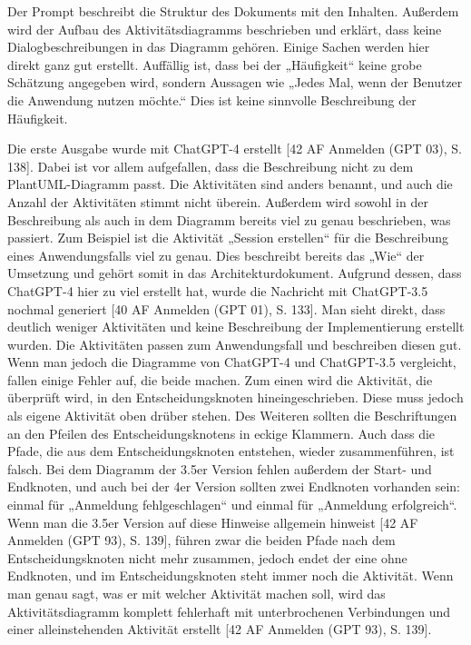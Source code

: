 Der Prompt beschreibt die Struktur des Dokuments mit den Inhalten. Außerdem wird der Aufbau des Aktivitätsdiagramms beschrieben und erklärt, 
dass keine Dialogbeschreibungen in das Diagramm gehören. Einige Sachen werden hier direkt ganz gut erstellt. Auffällig ist, dass bei der 
„Häufigkeit“ keine grobe Schätzung angegeben wird, sondern Aussagen wie „Jedes Mal, wenn der Benutzer die Anwendung nutzen möchte.“ Dies ist 
keine sinnvolle Beschreibung der Häufigkeit.

Die erste Ausgabe wurde mit ChatGPT-4 erstellt [42 AF Anmelden (GPT 03), S. 138]. Dabei ist vor allem aufgefallen, dass die Beschreibung nicht 
zu dem PlantUML-Diagramm passt. Die Aktivitäten sind anders benannt, und auch die Anzahl der Aktivitäten stimmt nicht überein. Außerdem wird 
sowohl in der Beschreibung als auch in dem Diagramm bereits viel zu genau beschrieben, was passiert. Zum Beispiel ist die Aktivität 
„Session erstellen“ für die Beschreibung eines Anwendungsfalls viel zu genau. Dies beschreibt bereits das „Wie“ der Umsetzung und gehört 
somit in das Architekturdokument. Aufgrund dessen, dass ChatGPT-4 hier zu viel erstellt hat, wurde die Nachricht mit ChatGPT-3.5 nochmal 
generiert [40 AF Anmelden (GPT 01), S. 133]. Man sieht direkt, dass deutlich weniger Aktivitäten und keine Beschreibung der Implementierung 
erstellt wurden. Die Aktivitäten passen zum Anwendungsfall und beschreiben diesen gut. Wenn man jedoch die Diagramme von ChatGPT-4 und ChatGPT-3.5 
vergleicht, fallen einige Fehler auf, die beide machen. Zum einen wird die Aktivität, die überprüft wird, in den Entscheidungsknoten 
hineingeschrieben. Diese muss jedoch als eigene Aktivität oben drüber stehen. Des Weiteren sollten die Beschriftungen an den Pfeilen des 
Entscheidungsknotens in eckige Klammern. Auch dass die Pfade, die aus dem Entscheidungsknoten entstehen, wieder zusammenführen, ist falsch. 
Bei dem Diagramm der 3.5er Version fehlen außerdem der Start- und Endknoten, und auch bei der 4er Version sollten zwei Endknoten vorhanden sein: 
einmal für „Anmeldung fehlgeschlagen“ und einmal für „Anmeldung erfolgreich“. Wenn man die 3.5er Version auf diese Hinweise allgemein hinweist 
[42 AF Anmelden (GPT 93), S. 139], führen zwar die beiden Pfade nach dem Entscheidungsknoten nicht mehr zusammen, jedoch endet der eine ohne 
Endknoten, und im Entscheidungsknoten steht immer noch die Aktivität. Wenn man genau sagt, was er mit welcher Aktivität machen soll, wird das 
Aktivitätsdiagramm komplett fehlerhaft mit unterbrochenen Verbindungen und einer alleinstehenden Aktivität erstellt [42 AF Anmelden (GPT 93), S. 139]. 
